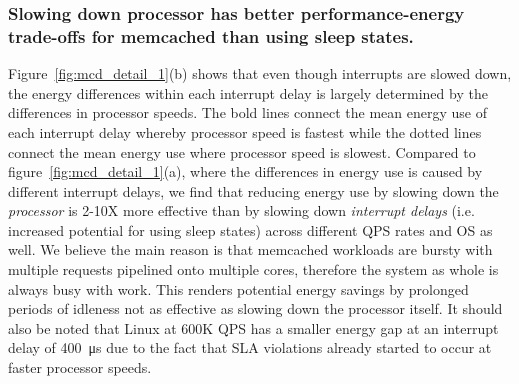 \subsubsection{Slowing down processor has better performance-energy trade-offs for memcached than using sleep states.} 
\label{sec:mcd:slowproctradeoff} 
Figure~\ref{fig:mcd_detail_1}(b) shows that even though interrupts are slowed down, the energy differences within each interrupt delay is largely determined by the differences in processor speeds. The bold lines connect the mean energy use of each interrupt delay whereby processor speed is fastest while the dotted lines connect the mean energy use where processor speed is slowest. Compared to figure~\ref{fig:mcd_detail_1}(a), where the differences in energy use is caused by different interrupt delays, we find that reducing energy use by slowing down the \textit{processor} is 2-10X more effective than by slowing down \textit{interrupt delays} (i.e. increased potential for using sleep states) across different QPS rates and OS as well. We believe the main reason is that memcached workloads are bursty with multiple requests pipelined onto multiple cores, therefore the system as whole is always busy with work. This renders potential energy savings by prolonged periods of idleness not as effective as slowing down the processor itself. It should also be noted that Linux at 600K QPS has a smaller energy gap at an interrupt delay of \SI{400}{\micro s} due to the fact that SLA violations already started to occur at faster processor speeds.

